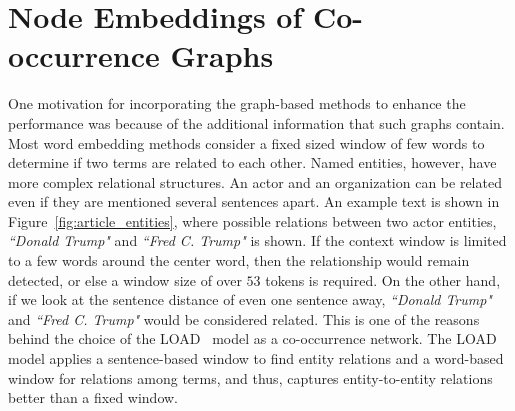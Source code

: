 \section{Node Embeddings of Co-occurrence Graphs}\label{sec:graph_based}

One motivation for incorporating the graph-based methods to enhance the performance was because of the additional information that such graphs contain. Most word embedding methods consider a fixed sized window of few words to determine if two terms are related to each other. Named entities, however, have more complex relational structures. An actor and an organization can be related even if they are mentioned several sentences apart. An example text is shown in Figure~\ref{fig:article_entities}, where possible relations between two actor entities, \emph{``Donald Trump"} and \emph{``Fred C. Trump"} is shown. If the context window is limited to a few words around the center word, then the relationship would remain detected, or else a window size of over $53$ tokens is required. On the other hand, if we look at the sentence distance of even one sentence away, \emph{``Donald Trump"} and \emph{``Fred C. Trump"} would be considered related. This is one of the reasons behind the choice of the LOAD~ model as a co-occurrence network. The LOAD model applies a sentence-based window to find entity relations and a word-based window for relations among terms, and thus, captures entity-to-entity relations better than a fixed window.

